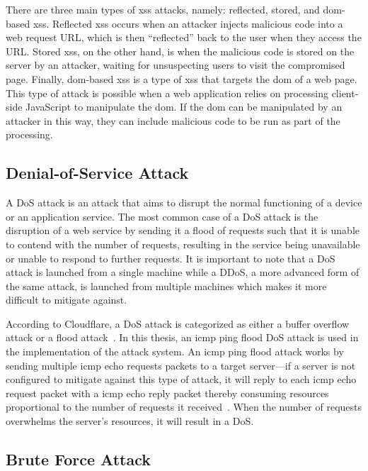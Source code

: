 There are three main types of \gls{xss} attacks, namely: reflected, stored, and \gls{dom}-based \gls{xss}.
Reflected \gls{xss} occurs when an attacker injects malicious code into a web request URL, which is then ``reflected'' back to the user when they access the URL.
Stored \gls{xss}, on the other hand, is when the malicious code is stored on the server by an attacker, waiting for unsuspecting users to visit the compromised page.
Finally, \gls{dom}-based \gls{xss} is a type of \gls{xss} that targets the \gls{dom} of a web page.
This type of attack is possible when a web application relies on processing client-side JavaScript to manipulate the \gls{dom}.
If the \gls{dom} can be manipulated by an attacker in this way, they can include malicious code to be run as part of the processing. \cite{portswigger}

\subsection{Denial-of-Service Attack}\label{subsec:dos-attack}
A \gls{DoS} attack is an attack that aims to disrupt the normal functioning of a device or an application service.
The most common case of a \gls{DoS} attack is the disruption of a web service by sending it a flood of requests such that it is unable to contend with the number of requests,
resulting in the service being unavailable or unable to respond to further requests.
It is important to note that a \gls{DoS} attack is launched from a single machine while a \gls{DDoS},
a more advanced form of the same attack, is launched from multiple machines which makes it more difficult to mitigate against.~\cite{cloudflare:denial-of-service}

According to Cloudflare, a \gls{DoS} attack is categorized as either a buffer overflow attack or a flood attack~\cite{cloudflare:denial-of-service}.
In this thesis, an \gls{icmp} ping flood \gls{DoS} attack is used in the implementation of the attack system.
An \gls{icmp} ping flood attack works by sending multiple \gls{icmp} echo requests packets to a target server---if a server is not configured to mitigate against this type of attack, it will reply to each \gls{icmp} echo request packet with a \gls{icmp} echo reply packet thereby consuming resources proportional to the number of requests it received~\cite{cloudflare:ping-flood}.
When the number of requests overwhelms the server's resources, it will result in a \gls{DoS}.


\subsection{Brute Force Attack}\label{subsec:brute-force-attack}

